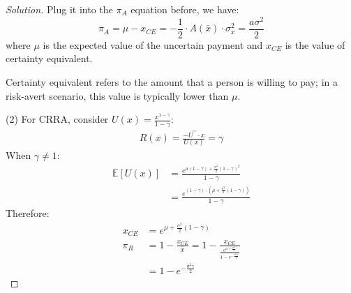 \documentclass[12pt]{article}
\newenvironment{problem}[2][Problem]{\begin{trivlist}
\item[\hskip \labelsep {\bfseries #1}\hskip \labelsep {\bfseries #2.}]}{\end{trivlist}}
\newenvironment{solution}
  {\renewcommand\qedsymbol{$\blacksquare$}\begin{proof}[Solution]}
  {\end{proof}}
\begin{document}
\begin{solution}
Plug it into the $\pi_A$ equation before, we have: 
\begin{equation}
\pi_A = \mu - x_{CE} = -\frac{1}{2} \cdot A(\bar{x}) \cdot \sigma_x^2 = \frac{a\sigma^2}{2}
\end{equation}
where $\mu$ is the expected value of the uncertain payment and $x_{CE}$ is the value of certainty equivalent.

Certainty equivalent refers to the amount that a person is willing to pay; in a risk-avert scenario, this value is typically lower than $\mu$. 

(2) For \gls{CRRA}, consider $U(x) = \frac{x^{1-\gamma}}{1-\gamma}$:
\begin{gather}
R(x) = \frac{-U^{\prime\prime} \cdot x}{U(x)} = \gamma
\end{gather}
When $\gamma \neq 1$:
\begin{align}
\mathbb{E}[U(x)] &= \frac{e^{\mu(1-\gamma) + \frac{\sigma^2}{2}(1-\gamma)^2}}{1-\gamma} \\
&= \frac{e^{(1-\gamma)\cdot (\mu + \frac{\sigma^2}{2}(1-\gamma))}}{1-\gamma}
\end{align}
Therefore:
\begin{align}
x_{CE} &=e^{\mu + \frac{\sigma^2}{2}(1-\gamma)} \\
\pi_R &= 1 - \frac{x_{CE}}{\bar{x}} = 1  - \frac{x_{CE}}{\frac{e^{\mu+
	\frac{\sigma^2}{2}}}{1-e^{-\frac{\sigma^2\gamma}{2}}}} \\
&= 1 - e^{-\frac{\sigma^2\gamma}{2}}
\end{align}
\end{solution}

%	
\end{document}
